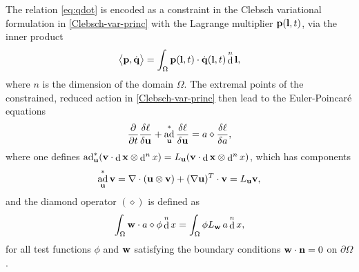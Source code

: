 \documentclass[12pt,onesided]{article}
\newcommand{\pp}[2]{\frac{\partial #1}{\partial #2}}
\def\q{{\bf{q}}}
\def\p{{\bf{p}}}
\def\l{{\bf{l}}}
\def\u{{\bf{u}}}
\def\v{{\bf{v}}}
\def\w{{\bf{w}}}
\DeclareMathOperator{\ad}{ad}
\DeclareMathOperator{\diff}{d}
\begin{document}
The relation \eqref{eq:qdot} is encoded as a constraint in the Clebsch variational formulation in \eqref{Clebsch-var-princ} with the Lagrange
multiplier $\p(\l,t)$, via the inner product
\begin{equation}
  \big\langle \p, \dot{\q}\big\rangle = \int_{\Omega} \p(\l,t)\cdot \dot{\q}(\l,t)
  \diff^n \l,
\end{equation}
where $n$ is the dimension of the domain $\Omega$. The
extremal points of the constrained, reduced action in \eqref{Clebsch-var-princ} then lead to the Euler-Poincar\'e equations
\begin{equation}
\pp{}{t}\frac{\delta \ell}{\delta \u} + \ad^*_\u \frac{\delta
  \ell}{\delta \u} = a\diamond \frac{\delta \ell}{\delta a},
  \label{e.EP}
\end{equation}
where one defines $\ad^*_\u (\v\cdot \diff {\bf x} \otimes \diff^nx) = L_{\u}(\v\cdot \diff {\bf x} \otimes \diff^nx)$, which has components
\begin{equation}
  \ad^*_\u \v = \nabla\cdot(\u\otimes \v) + (\nabla \u)^T\cdot \v
  = L_{\u}\v,
\label{adstar-def-components}  
\end{equation}
and the diamond operator $(\diamond)$ is defined as
\begin{equation}
  \int_\Omega \w \cdot a \diamond \phi \diff^n x = \int_\Omega \phi 
  L_\w \,a\diff^n x,
\end{equation}
for all test functions $\phi$ and $\w$ satisfying the boundary conditions $\w\cdot {\bf n}=0$ on $\partial\Omega$. 
\end{document}
